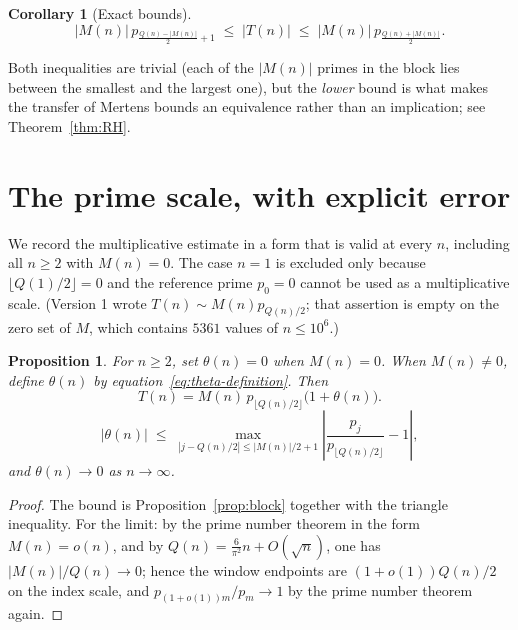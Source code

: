 \documentclass[11pt]{amsart}
\numberwithin{equation}{section}
\theoremstyle{plain}
\newtheorem{proposition}[theorem]{Proposition}
\newtheorem{corollary}[theorem]{Corollary}
\theoremstyle{definition}
\theoremstyle{remark}
\newcommand{\Mert}{M}
\newcommand{\Sq}{Q}
\begin{document}
\begin{corollary}[Exact bounds]\label{cor:bounds}
\begin{equation}
\label{eq:block-bounds}
|\Mert(n)|\,p_{\frac{\Sq(n)-|\Mert(n)|}{2}+1}
\;\le\;
|T(n)|
\;\le\;
|\Mert(n)|\,p_{\frac{\Sq(n)+|\Mert(n)|}{2}} .
\end{equation}
\end{corollary}

Both inequalities are trivial (each of the $|\Mert(n)|$ primes in the block lies
between the smallest and the largest one), but the \emph{lower} bound is what
makes the transfer of Mertens bounds an equivalence rather than an implication;
see Theorem~\ref{thm:RH}.

\section{The prime scale, with explicit error}
\label{sec:prime-scale}

We record the multiplicative estimate in a form that is valid at every $n$,
including all $n\ge2$ with $\Mert(n)=0$. The case $n=1$ is excluded only because
$\lfloor\Sq(1)/2\rfloor=0$ and the reference prime $p_0=0$ cannot be used as a
multiplicative scale. (Version 1 wrote
$T(n)\sim \Mert(n)p_{\Sq(n)/2}$; that assertion is empty on the zero set of
$\Mert$, which contains $5361$ values of $n\le10^{6}$.)

\begin{proposition}\label{prop:scale}
For $n\ge2$, set $\theta(n)=0$ when $M(n)=0$. When $M(n)\ne0$, define
$\theta(n)$ by equation~\eqref{eq:theta-definition}. Then
\begin{equation}
\label{eq:theta-definition}
T(n)=M(n)\,p_{\lfloor Q(n)/2\rfloor}\bigl(1+\theta(n)\bigr).
\end{equation}
\begin{equation}
\label{eq:theta-bound}
|\theta(n)|\;\le\;
\max_{|j-\Sq(n)/2|\le |\Mert(n)|/2+1}
\left|\frac{p_j}{p_{\lfloor \Sq(n)/2\rfloor}}-1\right| ,
\end{equation}
and $\theta(n)\to0$ as $n\to\infty$.
\end{proposition}

\begin{proof}
The bound is Proposition~\ref{prop:block} together with the triangle
inequality. For the limit: by the prime number theorem in the form
$\Mert(n)=o(n)$, and by $\Sq(n)=\tfrac{6}{\pi^2}n+O(\sqrt n)$, one has
$|\Mert(n)|/\Sq(n)\to0$; hence the window endpoints are
$(1+o(1))\Sq(n)/2$ on the index scale, and $p_{(1+o(1))m}/p_m\to1$ by the prime
number theorem again.
\end{proof}
\end{document}
